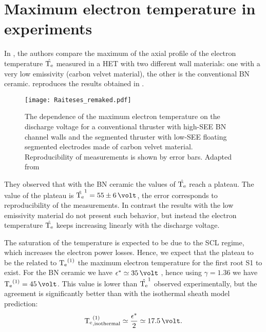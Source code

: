 

    
    \section{Maximum electron temperature in experiments}
    
    
    In \citet{raitses2006}, the authors compare the maximum of the axial profile of the electron temperature $\hat{\mathrm{T_e}}$ measured in a \ac{HET} with two different wall materials\string: one with a very low emissivity (carbon velvet material), the other is the conventional \ac{BN} ceramic.
     reproduces the results obtained in \citet{raitses2006}.

    \begin{figure}[hbt]
      \centering
      \texttt{[image: Raiteses\_remaked.pdf]}
      \caption{ The dependence of the maximum electron temperature on the discharge  voltage for a conventional thruster with high-SEE \acs{BN} channel walls and the segmented thruster with low-SEE floating segmented electrodes made of carbon velvet material. Reproducibility of measurements is shown by error bars. Adapted from \citet[Fig. 3]{raitses2006} }
      \label{fig-raiteses2006}
    \end{figure}

    They observed that with the \ac{BN} ceramic the values of $\hat{\mathrm{T_e}}$ reach a plateau.
    The value of the plateau is $\hat{\Te}^1 = 55 \pm 6\,\volt$, the error corresponds to reproducibility of the measurements.
    In contrast the results with the low emissivity material do not present such behavior, but instead the electron temperature $\hat{\mathrm{T_e}}$ keeps increasing linearly with the discharge voltage.
    
    The saturation of the temperature is expected to be due to the \ac{SCL} regime, which increases the electron power losses.
    Hence, we expect that the plateau to be the related to $\mathrm{T_e}^{(1)}$ the maximum electron temperature for the first root S1 to exist.
    For the \ac{BN} ceramic we have $\crover \simeq 35\,\volt$ \citep{smirnov2004}, hence using $\gamma=1.36$ we have $\Te^{(1)} = 45\,\volt$.
    This value is lower than $\hat{\mathrm{T_e}}^1$ observed experimentally, but the agreement is significantly better than with the isothermal sheath model prediction\string:
    \begin{equation} \label{eq-Temaxisothermal}
      \Te^{(1)}_{\rm , isothermal} \simeq \frac{\crover}{2} \simeq 17.5 \,\volt.
    \end{equation}
    
